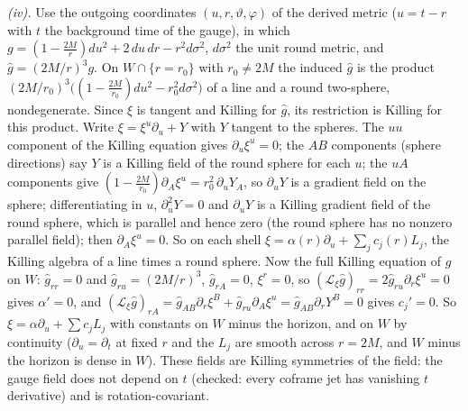 \emph{(iv).} Use the outgoing coordinates $(u, r, \vartheta, \varphi)$ of the derived metric ($u = t - r$ with $t$ the background time of the gauge), in which $g = (1 - \tfrac{2M}{r})du^{2} + 2\,du\,dr - r^{2}d\sigma^{2}$, $d\sigma^{2}$ the unit round metric, and $\hat g = (2M/r)^{3}g$. On $W \cap \{r = r_{0}\}$ with $r_{0} \neq 2M$ the induced $\hat g$ is the product $(2M/r_{0})^{3}\bigl((1 - \tfrac{2M}{r_{0}})du^{2} - r_{0}^{2}d\sigma^{2}\bigr)$ of a line and a round two-sphere, nondegenerate. Since $\xi$ is tangent and Killing for $\hat g$, its restriction is Killing for this product. Write $\xi = \xi^{u}\partial_{u} + Y$ with $Y$ tangent to the spheres. The $uu$ component of the Killing equation gives $\partial_{u}\xi^{u} = 0$; the $AB$ components (sphere directions) say $Y$ is a Killing field of the round sphere for each $u$; the $uA$ components give $(1 - \tfrac{2M}{r_{0}})\partial_{A}\xi^{u} = r_{0}^{2}\,\partial_{u}Y_{A}$, so $\partial_{u}Y$ is a gradient field on the sphere; differentiating in $u$, $\partial_{u}^{2}Y = 0$ and $\partial_{u}Y$ is a Killing gradient field of the round sphere, which is parallel and hence zero (the round sphere has no nonzero parallel field); then $\partial_{A}\xi^{u} = 0$. So on each shell $\xi = \alpha(r)\partial_{u} + \sum_{j}c_{j}(r)L_{j}$, the Killing algebra of a line times a round sphere. Now the full Killing equation of $\hat g$ on $W$: $\hat g_{rr} = 0$ and $\hat g_{ru} = (2M/r)^{3}$, $\hat g_{rA} = 0$, $\xi^{r} = 0$, so $(\mathcal{L}_{\xi}\hat g)_{rr} = 2\hat g_{ru}\partial_{r}\xi^{u} = 0$ gives $\alpha' = 0$, and $(\mathcal{L}_{\xi}\hat g)_{rA} = \hat g_{AB}\partial_{r}\xi^{B} + \hat g_{ru}\partial_{A}\xi^{u} = \hat g_{AB}\partial_{r}Y^{B} = 0$ gives $c_{j}' = 0$. So $\xi = \alpha\partial_{u} + \sum c_{j}L_{j}$ with constants on $W$ minus the horizon, and on $W$ by continuity ($\partial_{u} = \partial_{t}$ at fixed $r$ and the $L_{j}$ are smooth across $r = 2M$, and $W$ minus the horizon is dense in $W$). These fields are Killing symmetries of the field: the gauge field does not depend on $t$ (checked: every coframe jet has vanishing $t$ derivative) and is rotation-covariant.


